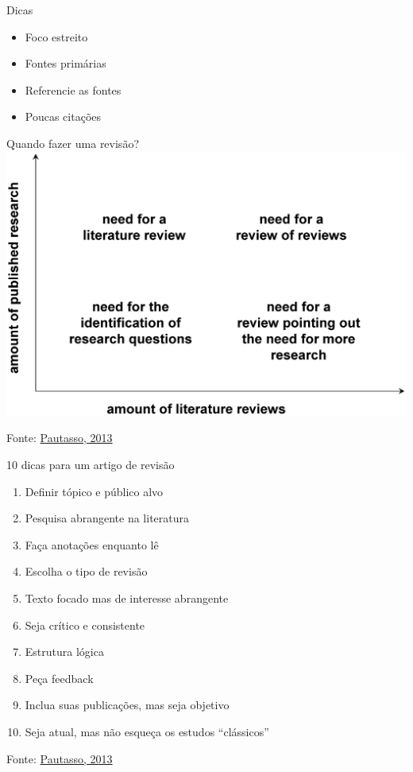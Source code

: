 \documentclass{beamer}
\begin{document}
\begin{frame}{Dicas}
  \begin{itemize}
    \footnotesize
  \item Foco estreito
    \bigskip
  \item Fontes primárias
    \bigskip
  \item Referencie as fontes
    \bigskip
  \item Poucas citações
  \end{itemize}
\end{frame}

\begin{frame}{Quando fazer uma revisão?}
  \includegraphics[height=0.8\textheight]{Revisao_resumo/10_dicas_revisao}

  \vfill
  \scriptsize
  \hfill Fonte: \href{https://doi.org/10.1371/journal.pcbi.1003149}{Pautasso, 2013}
\end{frame}

\begin{frame}{10 dicas para um artigo de revisão}
  \begin{enumerate}
    \scriptsize
  \item<1> Definir tópico e público alvo
    \smallskip
  \item<2> Pesquisa abrangente na literatura
    \smallskip
  \item<3> Faça anotações enquanto lê
    \smallskip
  \item<4> Escolha o tipo de revisão
    \smallskip
  \item<5> Texto focado mas de interesse abrangente
    \smallskip
  \item<6> Seja crítico e consistente
    \smallskip
  \item<7> Estrutura lógica
    \smallskip
  \item<8> Peça feedback
    \smallskip
  \item<9> Inclua suas publicações, mas seja objetivo
    \smallskip
  \item<10> Seja atual, mas não esqueça os estudos ``clássicos''
  \end{enumerate}

  \vfill
  \scriptsize
  \hfill Fonte: \href{https://doi.org/10.1371/journal.pcbi.1003149}{Pautasso, 2013}
\end{frame}
\end{document}
